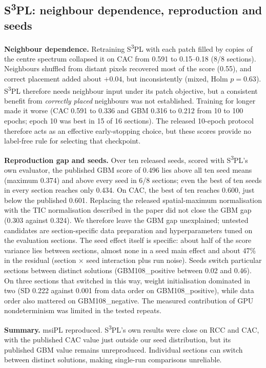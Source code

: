 \subsection{S\textsuperscript{3}PL: neighbour dependence, reproduction and seeds}
\label{sec:res-s3pl}
\textbf{Neighbour dependence.} Retraining S\textsuperscript{3}PL with each patch
filled by copies of the centre spectrum collapsed it on CAC from 0.591 to
0.15--0.18 (8/8 sections). Neighbours shuffled from distant pixels recovered
most of the score (0.55), and correct placement added about $+0.04$, but
inconsistently (mixed, Holm $p=0.63$). S\textsuperscript{3}PL therefore needs
neighbour input under its patch objective, but a consistent benefit from
\emph{correctly placed} neighbours was not established. Training for longer
made it worse (CAC 0.591 to 0.336 and GBM 0.316 to 0.212 from 10 to 100
epochs; epoch 10 was best in 15 of 16 sections). The released 10-epoch
protocol therefore acts as an effective early-stopping choice, but these
scores provide no label-free rule for selecting that checkpoint.

\textbf{Reproduction gap and seeds.} Over ten released seeds, scored
with S\textsuperscript{3}PL's own evaluator, the published GBM score of 0.496 lies above all ten
seed means (maximum 0.374) and above every seed in 6/8 sections; even the best
of ten seeds in every section reaches only 0.434. On CAC, the best of ten
reaches 0.600, just below the published 0.601. Replacing the released
spatial-maximum normalisation with the TIC normalisation described in the paper
did not close the GBM gap (0.303 against 0.324). We therefore leave the GBM gap
unexplained; untested candidates are section-specific data preparation and
hyperparameters tuned on the evaluation sections. The seed effect itself is
specific: about half of the score variance lies between sections, almost none
in a seed main effect and about 47\% in the residual (section $\times$ seed interaction plus run
noise).
Seeds switch particular sections between distinct solutions (GBM108\_positive
between 0.02 and 0.46). On three sections that switched in this way, weight
initialisation dominated in two (SD 0.222 against 0.001 from data order on
GBM108\_positive), while data order also mattered on GBM108\_negative. The
measured contribution of GPU nondeterminism was limited in the tested repeats.


\textbf{Summary.} msiPL reproduced. S\textsuperscript{3}PL's own results were
close on RCC and CAC, with the published CAC value just outside our seed
distribution, but its published GBM value remains unreproduced. Individual sections can
switch between distinct solutions, making single-run comparisons unreliable.

